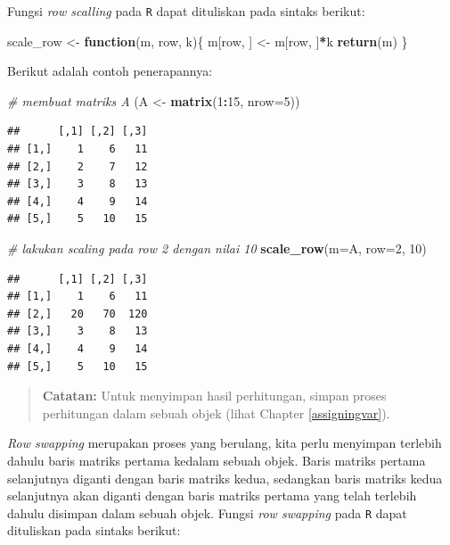 \documentclass[]{book}
\newenvironment{Shaded}{\begin{snugshade}}{\end{snugshade}}
\newcommand{\CommentTok}[1]{\textcolor[rgb]{0.56,0.35,0.01}{\textit{#1}}}
\newcommand{\ControlFlowTok}[1]{\textcolor[rgb]{0.13,0.29,0.53}{\textbf{#1}}}
\newcommand{\DataTypeTok}[1]{\textcolor[rgb]{0.13,0.29,0.53}{#1}}
\newcommand{\DecValTok}[1]{\textcolor[rgb]{0.00,0.00,0.81}{#1}}
\newcommand{\KeywordTok}[1]{\textcolor[rgb]{0.13,0.29,0.53}{\textbf{#1}}}
\newcommand{\NormalTok}[1]{#1}
\newcommand{\OperatorTok}[1]{\textcolor[rgb]{0.81,0.36,0.00}{\textbf{#1}}}
\newcommand{\StringTok}[1]{\textcolor[rgb]{0.31,0.60,0.02}{#1}}
\theoremstyle{definition}
\theoremstyle{definition}
\theoremstyle{definition}
\theoremstyle{remark}
\begin{document}
Fungsi \emph{row scalling} pada \texttt{R} dapat dituliskan pada sintaks berikut:

\begin{Shaded}
\begin{Highlighting}[]
\NormalTok{scale_row <-}\StringTok{ }\ControlFlowTok{function}\NormalTok{(m, row, k)\{}
\NormalTok{ m[row, ] <-}\StringTok{ }\NormalTok{m[row, ]}\OperatorTok{*}\NormalTok{k}
 \KeywordTok{return}\NormalTok{(m)}
\NormalTok{\}}
\end{Highlighting}
\end{Shaded}

Berikut adalah contoh penerapannya:

\begin{Shaded}
\begin{Highlighting}[]
\CommentTok{# membuat matriks A}
\NormalTok{(A <-}\StringTok{ }\KeywordTok{matrix}\NormalTok{(}\DecValTok{1}\OperatorTok{:}\DecValTok{15}\NormalTok{, }\DataTypeTok{nrow=}\DecValTok{5}\NormalTok{))}
\end{Highlighting}
\end{Shaded}

\begin{verbatim}
##      [,1] [,2] [,3]
## [1,]    1    6   11
## [2,]    2    7   12
## [3,]    3    8   13
## [4,]    4    9   14
## [5,]    5   10   15
\end{verbatim}

\begin{Shaded}
\begin{Highlighting}[]
\CommentTok{# lakukan scaling pada row 2 dengan nilai 10}
\KeywordTok{scale_row}\NormalTok{(}\DataTypeTok{m=}\NormalTok{A, }\DataTypeTok{row=}\DecValTok{2}\NormalTok{, }\DecValTok{10}\NormalTok{)}
\end{Highlighting}
\end{Shaded}

\begin{verbatim}
##      [,1] [,2] [,3]
## [1,]    1    6   11
## [2,]   20   70  120
## [3,]    3    8   13
## [4,]    4    9   14
## [5,]    5   10   15
\end{verbatim}

\begin{quote}
\textbf{Catatan:} Untuk menyimpan hasil perhitungan, simpan proses perhitungan dalam sebuah objek (lihat Chapter \ref{assigningvar}).
\end{quote}

\emph{Row swapping} merupakan proses yang berulang, kita perlu menyimpan terlebih dahulu baris matriks pertama kedalam sebuah objek. Baris matriks pertama selanjutnya diganti dengan baris matriks kedua, sedangkan baris matriks kedua selanjutnya akan diganti dengan baris matriks pertama yang telah terlebih dahulu disimpan dalam sebuah objek. Fungsi \emph{row swapping} pada \texttt{R} dapat dituliskan pada sintaks berikut:
\end{document}

